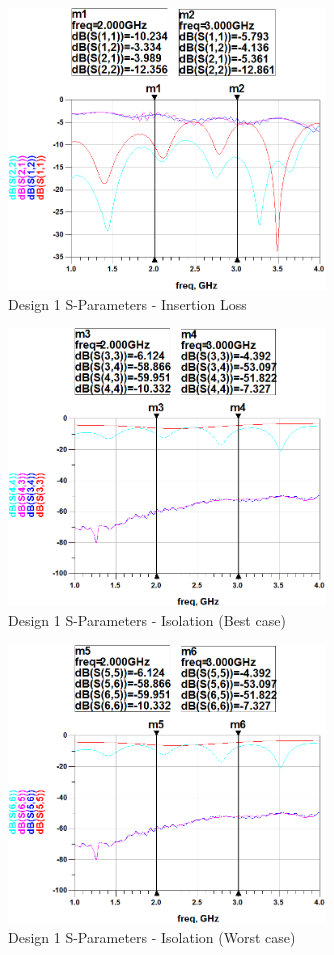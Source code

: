 \documentclass[12pt,openany,a4paper]{book}
\begin{document}
\begin{figure}[H]
	\centering
	\includegraphics[width=0.75\textwidth]{Design3-1.png}
	\caption{Design 1 S-Parameters - Insertion Loss}
	\label{fig:design3_1}
\end{figure} 
\begin{figure}[H]
	\centering
	\includegraphics[width=0.75\textwidth]{Design3-2.png}
	\caption{Design 1 S-Parameters - Isolation (Best case)}
	\label{fig:design3_2}
\end{figure} 
\begin{figure}[H]
	\centering
	\includegraphics[width=0.75\textwidth]{Design3-3.png}
	\caption{Design 1 S-Parameters - Isolation (Worst case)}
	\label{fig:design1_3}
\end{figure} 
\end{document}
